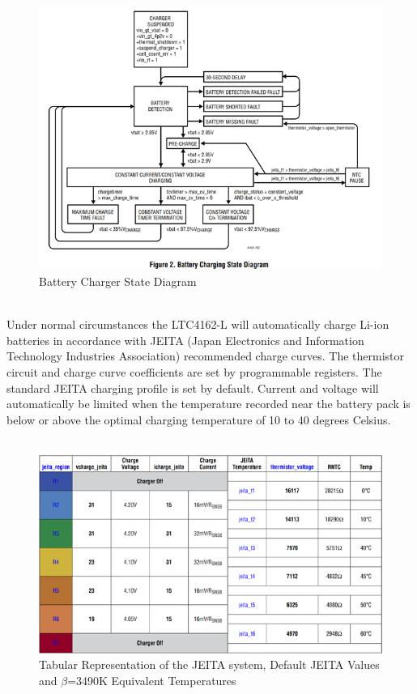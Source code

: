 \documentclass[12pt]{article}
\begin{document}
\begin{figure}[h!]
\centering
\includegraphics[width=0.9\linewidth]{bat_charge_state_diagram}
\caption{Battery Charger State Diagram \cite{ltc4162L}}
\end{figure}
\hfill \\
\indent
Under normal circumstances the LTC4162-L will automatically charge Li-ion batteries in accordance with JEITA (Japan Electronics and Information Technology Industries Association) recommended charge curves. The thermistor circuit and charge curve coefficients are set by programmable registers. The standard JEITA charging profile is set by default. Current and voltage will automatically be limited when the temperature recorded near the battery pack is below or above the optimal charging temperature of 10 to 40 degrees Celsius.\\
\hfill \\
\begin{figure}[h!]
\centering
\includegraphics[width=1.0\linewidth]{rep_jeita}
\caption{Tabular Representation of the JEITA system, Default JEITA Values and $\beta$=3490K Equivalent Temperatures \cite{ltc4162L}}
\end{figure}
\end{document}
